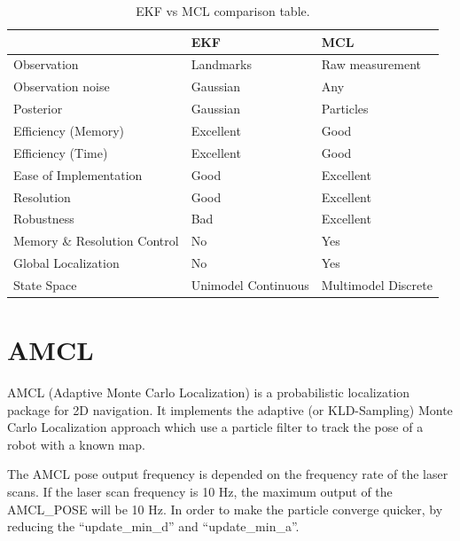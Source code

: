 \documentclass[10pt,journal,compsoc]{IEEEtran}
\begin{document}
\begin{table}[thpb]
\begin{tabular}{|l|l|l|}
\hline
                             & \textbf{EKF}        & \textbf{MCL}        \\ \hline
Observation                  & Landmarks           & Raw measurement     \\ \hline
Observation noise            & Gaussian            & Any                 \\ \hline
Posterior                    & Gaussian            & Particles           \\ \hline
Efficiency (Memory)          & Excellent           & Good                \\ \hline
Efficiency (Time)            & Excellent           & Good                \\ \hline
Ease of Implementation       & Good                & Excellent           \\ \hline
Resolution                   & Good                & Excellent           \\ \hline
Robustness                   & Bad                 & Excellent           \\ \hline
Memory \& Resolution Control & No                  & Yes                 \\ \hline
Global Localization          & No                  & Yes                 \\ \hline
State Space                  & Unimodel Continuous & Multimodel Discrete \\ \hline
\end{tabular}
\caption{EKF vs MCL comparison table.}
\label{tab:template1}
\end{table}

\section{AMCL}
AMCL (Adaptive Monte Carlo Localization) is a probabilistic localization package for 2D navigation. It implements the adaptive (or KLD-Sampling) Monte Carlo Localization approach which use a particle filter to track the pose of a robot with a known map. 

The AMCL pose output frequency is depended on the frequency rate of the laser scans. If the laser scan frequency is 10 Hz, the maximum output of the AMCL\_POSE will be 10 Hz. In order to make the particle converge quicker, by reducing the “update\_min\_d” and “update\_min\_a”.
\end{document}
